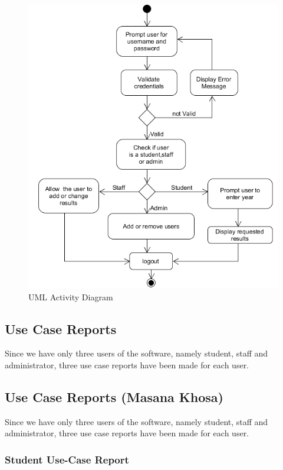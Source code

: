 \documentclass[10pt,onecolumn]{RequimentsGathering}
\begin{document}
	\begin{center}
		\begin{figure}[h]
			\centering
			\includegraphics[trim={0cm 0 0 0},clip]{UML-Activity}
			\caption{UML Activity Diagram}
		\end{figure}
	\end{center}
	
	\subsection{Use Case Reports}
	Since we have only three users of the software, namely student, staff and administrator, three use case reports have been made for each user. 
	
	
	\subsection{Use Case Reports (Masana Khosa)}
	Since we have only three users of the software, namely student, staff and administrator, three use case reports have been made for each user. 
	
	
	\clearpage
	\subsubsection{Student Use-Case Report}$\;\;\;\;\;\;\;\;\;\;\;\;\;\;\;\;\;\;\;\;\;\;\;$
	
\end{document}
